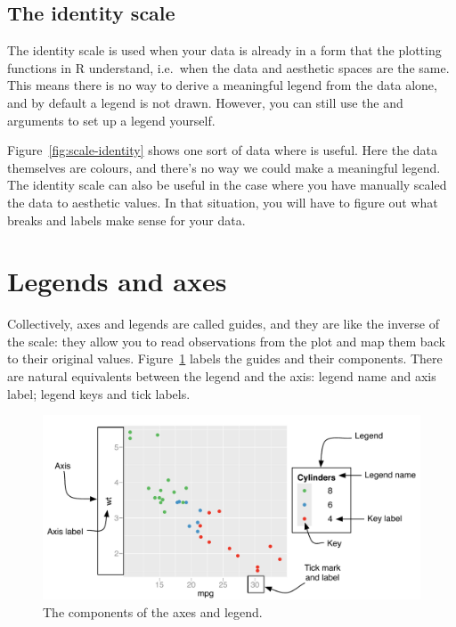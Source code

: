 \subsection{The identity scale}
\label{sub:scale-identity}

The identity scale is used when your data is already in a form that the plotting functions in R understand, i.e.\ when the data and aesthetic spaces are the same.  This means there is no way to derive a meaningful legend from the data alone, and by default a legend is not drawn.  However, you can still use the  and  arguments to set up a legend yourself.

Figure~\ref{fig:scale-identity} shows one sort of data where  is useful.  Here the data themselves are colours, and there's no way we could make a meaningful legend.  The identity scale can also be useful in the case where you have manually scaled the data to aesthetic values.  In that situation, you will have to figure out what breaks and labels make sense for your data.

% 


\section{Legends and axes}
\label{sec:guides}

Collectively, axes and legends are called guides, and they are like the inverse of the scale: they allow you to read observations from the plot and map them back to their original values.  Figure~\ref{fig:labelled-guides} labels the guides and their components.  There are natural equivalents between the legend and the axis: legend name and axis label; legend keys and tick labels.

\begin{figure}[htbp]
  \centering
  \includegraphics[width=\linewidth]{scale-guides}
  
  \caption{The components of the axes and legend.}
  \label{fig:labelled-guides}
\end{figure}

